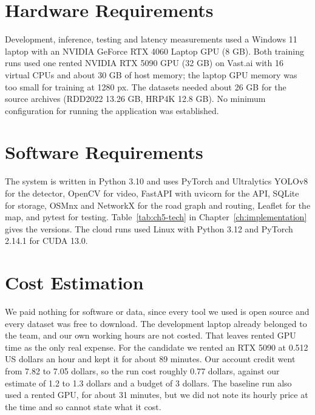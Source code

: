 \section{Hardware Requirements}
Development, inference, testing and latency measurements used a Windows 11 laptop with an NVIDIA GeForce RTX 4060 Laptop GPU (8 GB). Both training runs used one rented NVIDIA RTX 5090 GPU (32 GB) on Vast.ai with 16 virtual CPUs and about 30 GB of host memory; the laptop GPU memory was too small for training at 1280 px. The datasets needed about 26 GB for the source archives (RDD2022 13.26 GB, HRP4K 12.8 GB). No minimum configuration for running the application was established.

\section{Software Requirements}
The system is written in Python 3.10 and uses PyTorch \cite{paszke2019pytorch} and Ultralytics YOLOv8 \cite{jocher2023yolov8} for the detector, OpenCV for video, FastAPI with uvicorn for the API, SQLite for storage, OSMnx \cite{boeing2017osmnx} and NetworkX for the road graph and routing, Leaflet for the map, and pytest for testing. Table~\ref{tab:ch5-tech} in Chapter~\ref{ch:implementation} gives the versions. The cloud runs used Linux with Python 3.12 and PyTorch 2.14.1 for CUDA 13.0.

\section{Cost Estimation}
We paid nothing for software or data, since every tool we used is open source and every dataset was free to download. The development laptop already belonged to the team, and our own working hours are not costed. That leaves rented GPU time as the only real expense. For the candidate we rented an RTX 5090 at 0.512 US dollars an hour and kept it for about 89 minutes. Our account credit went from 7.82 to 7.05 dollars, so the run cost roughly 0.77 dollars, against our estimate of 1.2 to 1.3 dollars and a budget of 3 dollars. The baseline run also used a rented GPU, for about 31 minutes, but we did not note its hourly price at the time and so cannot state what it cost.
